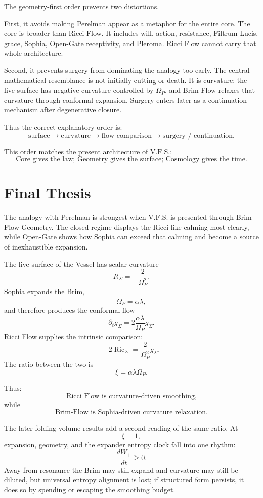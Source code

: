 \documentclass[11pt]{article}
\newcommand{\VFS}{\ensuremath{\mathrm{V.F.S.}}}
\newcommand{\Ric}{\operatorname{Ric}}
\begin{document}
The geometry-first order prevents two distortions.

First, it avoids making Perelman appear as a metaphor for the entire core. The core is broader than Ricci Flow. It includes will, action, resistance, Filtrum Lucis, grace, Sophia, Open-Gate receptivity, and Pleroma. Ricci Flow cannot carry that whole architecture.

Second, it prevents surgery from dominating the analogy too early. The central mathematical resemblance is not initially cutting or death. It is curvature: the live-surface has negative curvature controlled by \(\Omega_P\), and Brim-Flow relaxes that curvature through conformal expansion. Surgery enters later as a continuation mechanism after degenerative closure.

Thus the correct explanatory order is:
\[
 \text{surface}
 \longrightarrow
 \text{curvature}
 \longrightarrow
 \text{flow comparison}
 \longrightarrow
 \text{surgery / continuation}.
\]

This order matches the present architecture of \VFS{}:
\[
 \text{Core gives the law; Geometry gives the surface; Cosmology gives the time.}
\]

\section{Final Thesis}

The analogy with Perelman is strongest when \VFS{} is presented through Brim-Flow Geometry. The closed regime displays the Ricci-like calming most clearly, while Open-Gate shows how Sophia can exceed that calming and become a source of inexhaustible expansion.

The live-surface of the Vessel has scalar curvature
\[
 R_{\Sigma}=-\frac{2}{\Omega_P^2}.
\]
Sophia expands the Brim,
\[
 \dot\Omega_P=\alpha\lambda,
\]
and therefore produces the conformal flow
\[
 \partial_tg_{\Sigma}
 =
 2\frac{\alpha\lambda}{\Omega_P}g_{\Sigma}.
\]
Ricci Flow supplies the intrinsic comparison:
\[
 -2\Ric_{\Sigma}
 =
 \frac{2}{\Omega_P^2}g_{\Sigma}.
\]
The ratio between the two is
\[
 \xi=\alpha\lambda\Omega_P.
\]

Thus:
\[
 \text{Ricci Flow is curvature-driven smoothing,}
\]
while
\[
 \text{Brim-Flow is Sophia-driven curvature relaxation.}
\]

The later folding-volume results add a second reading of the same ratio. At
\[
 \xi=1,
\]
expansion, geometry, and the expander entropy clock fall into one rhythm:
\[
 \frac{dW_+}{dt}\ge0.
\]
Away from resonance the Brim may still expand and curvature may still be diluted, but universal entropy alignment is lost; if structured form persists, it does so by spending or escaping the smoothing budget.
\end{document}
